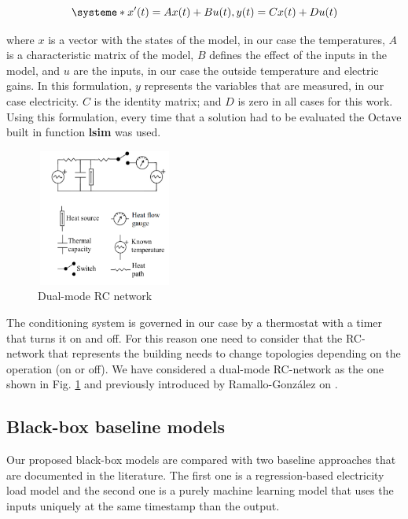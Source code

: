 \documentclass[10pt, conference, compsocconf]{IEEEtran}
\begin{document}
\begin{equation}\label{eq1}
\systeme*{x'(t)=Ax(t) + Bu(t), y(t)= Cx(t) + Du(t)}
\end{equation}

where $x$ is a vector with the states of the model, in our case the temperatures, $A$ is a characteristic matrix of the model, $B$ defines the effect of the inputs in the model, and $u$ are the inputs, in our case the outside temperature and electric gains. In this formulation, $y$ represents the variables that are measured, in our case electricity. $C$ is the identity matrix; and $D$ is zero in all cases for this work. Using this formulation, every time that a solution had to be evaluated the Octave built in function \textbf{lsim} was used.

\begin{figure}[h]%
\centering
\centerline{\includegraphics[width=4.5cm,height=4.5cm,keepaspectratio]{./pics/figAlf.pdf}}
\caption{Dual-mode RC network}\vspace*{-6pt}
  \label{fig:alf}
\end{figure}

The conditioning system is governed in our case by a thermostat with a timer that turns it on and off. For this reason one need to consider that the RC-network that represents the building needs to change topologies depending on the operation (on or off). We have considered a dual-mode RC-network as the one shown in Fig. \ref{fig:alf} and previously introduced by Ramallo-Gonz\'alez on \cite{ramalloidentifying}.



\subsection{Black-box baseline models}

Our proposed black-box models are compared with two baseline approaches that are documented in the literature. The first one is a regression-based electricity load model and the second one is a purely machine learning model that uses the inputs uniquely at the same timestamp than the output. 
\end{document}
